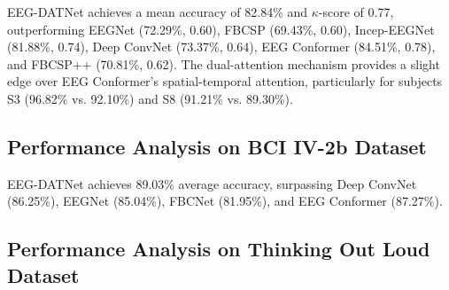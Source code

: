\documentclass[pdflatex,sn-mathphys-num]{sn-jnl}%
\theoremstyle{thmstyleone}
\theoremstyle{thmstyletwo}
\theoremstyle{thmstylethree}
\begin{document}
EEG-DATNet achieves a mean accuracy of 82.84\% and \(\kappa\)-score of 0.77, outperforming EEGNet (72.29\%, 0.60), FBCSP (69.43\%, 0.60), Incep-EEGNet (81.88\%, 0.74), Deep ConvNet (73.37\%, 0.64), EEG Conformer (84.51\%, 0.78), and FBCSP++ (70.81\%, 0.62). The dual-attention mechanism provides a slight edge over EEG Conformer’s spatial-temporal attention, particularly for subjects S3 (96.82\% vs. 92.10\%) and S8 (91.21\% vs. 89.30\%).

\subsection{Performance Analysis on BCI IV-2b Dataset}

\begin{table*}[htbp]
\centering
\caption{Classification Accuracies (\%) on BCI IV-2b}
\label{tab:BCI_IV_2b}
\end{table*}

EEG-DATNet achieves 89.03\% average accuracy, surpassing Deep ConvNet (86.25\%), EEGNet (85.04\%), FBCNet (81.95\%), and EEG Conformer (87.27\%).

\subsection{Performance Analysis on Thinking Out Loud Dataset}
\end{document}
